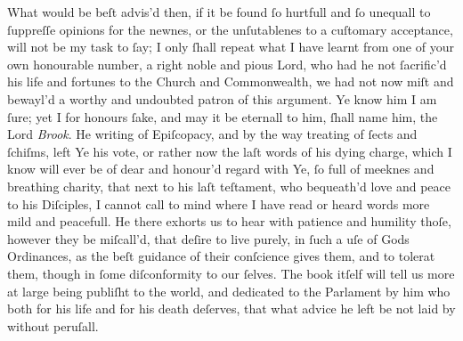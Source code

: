 What would be beſt advis'd then, if it be found ſo hurtfull and ſo unequall to
ſuppreſſe opinions for the newnes, or the unſutablenes to a cuſtomary
acceptance, will not be my task to ſay; I only ſhall repeat what I have learnt
from one of your own honourable number, a right noble and pious Lord, who had he
not ſacrific'd his life and fortunes to the Church and Commonwealth, we had not
now miſt and bewayl'd a worthy and undoubted patron of this argument.  Ye know
him I am ſure; yet I for honours ſake, and may it be eternall to him, ſhall name
him, the Lord \textit{Brook}.  He writing of Epiſcopacy, and by the way treating
of ſects and ſchiſms, left Ye his vote, or rather now the laſt words of his
dying charge, which I know will ever be of dear and honour'd regard with Ye, ſo
full of meeknes and breathing charity, that next to his laſt teſtament, who
bequeath'd love and peace to his Diſciples, I cannot call to mind where I have
read or heard words more mild and peacefull.  He there exhorts us to hear with
patience and humility thoſe, however they be miſcall'd, that deſire to live
purely, in ſuch a uſe of Gods Ordinances, as the beſt guidance of their
conſcience gives them, and to tolerat them, though in ſome diſconformity to our
ſelves.  The book itſelf will tell us more at large being publiſht to the world,
and dedicated to the Parlament by him who both for his life and for his death
deſerves, that what advice he left be not laid by without peruſall.

